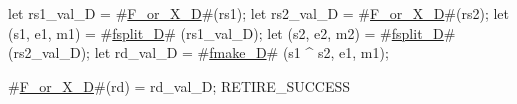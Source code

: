 let rs1_val_D    = #\hyperref[sailRISCVzFzyorzyXzyD]{F\_or\_X\_D}#(rs1);
let rs2_val_D    = #\hyperref[sailRISCVzFzyorzyXzyD]{F\_or\_X\_D}#(rs2);
let (s1, e1, m1) = #\hyperref[sailRISCVzfsplitzyD]{fsplit\_D}# (rs1_val_D);
let (s2, e2, m2) = #\hyperref[sailRISCVzfsplitzyD]{fsplit\_D}# (rs2_val_D);
let rd_val_D     = #\hyperref[sailRISCVzfmakezyD]{fmake\_D}# (s1 ^ s2, e1, m1);

#\hyperref[sailRISCVzFzyorzyXzyD]{F\_or\_X\_D}#(rd) = rd_val_D;
RETIRE_SUCCESS
